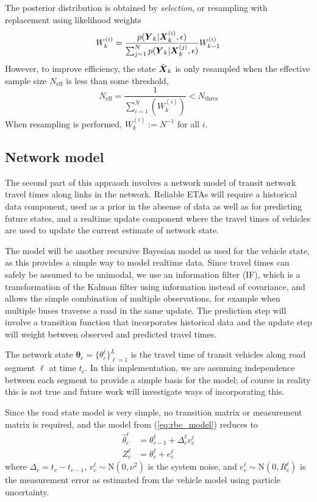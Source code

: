 The posterior distribution is obtained by \emph{selection},
or resampling with replacement using likelihood weights
\begin{equation*}
W_k^{(i)} = \frac{p(\mbox{$\boldsymbol{Y}$}_k | \mbox{$\boldsymbol{X}$}_k^{(i)}, \epsilon)}{
    \sum_{j=1}^N p(\mbox{$\boldsymbol{Y}$}_k | \mbox{$\boldsymbol{X}$}_k^{(j)}, \epsilon)
} 
W_{k-1}^{(i)} 
\end{equation*}
However, to improve efficiency, the state $\tilde {\mbox{$\boldsymbol{X}$}}_k$ is only resampled
when the effective sample size 
$N_{\text{eff}}$ is less than some threshold,
\begin{equation*}
N_{\text{eff}} = \frac{1}{\sum_{i=1}^N (W_k^{(i)})} < N_{\text{thres}}
\end{equation*}
When resampling is performed, $W_k^{(i)} := N^{-1}$ for all $i$.


\subsection{Network model}
\label{sec:kf}

The second part of this appraoch involves a network model of transit network travel times along links in the network.
Reliable ETAs will require a historical data component,
used as a prior in the absense of data as well as for
predicting future states, 
and a realtime update component where the travel times of vehicles
are used to update the current estimate of network state.

The model will be another recursive Bayesian model as used for the vehicle state,
as this provides a simple way to model realtime data.
Since travel times can safely be assumed to be unimodal,
we use an information filter (IF),
which is a transformation of the Kalman filter
using information instead of covariance,
and allows the simple combination of multiple observations,
for example when multiple buses traverse a road in the same update.
The prediction step will involve a transition function that incorporates historical data
and the update step will weight between observed and predicted travel times.

The network state $\boldsymbol\theta_c = \{\theta_c^\ell\}_{\ell = 1}^L$ is the travel time 
of transit vehicles along road segment $\ell$ at time $t_c$.
In this implementation, we are assuming independence between each segment
to provide a simple basis for the model; of course in reality this
is not true and future work will investigate ways of incorporating this.

Since the road state model is very simple, 
no transition matrix or measurement matrix is required,
and the model from (\ref{eq:rbe_model}) reduces to
\begin{equation}
\begin{split}
\hat \theta_c^\ell &= \theta_{c-1}^\ell + \Delta_c^\ell v_c^\ell \\
Z_c^\ell &= \theta_c^\ell + e_c^\ell
\end{split}
\end{equation}
where $\Delta_c = t_c - t_{c-1}$,
$v_c^\ell \sim \mathrm{N}(0, \nu^2)$ is the system noise,
and $e_c^\ell \sim \mathrm{N}(0, R_c^\ell)$ is the measurement error
as estimated from the vehicle model using particle uncertainty.

